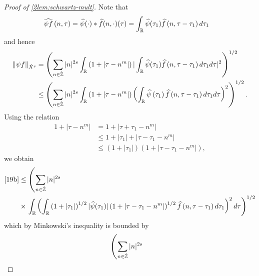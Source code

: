%
%
%
%
%
\begin{proof}[Proof of \cref{2lem:schwartz-mult}]
Note that
%
%
\begin{equation*}
	\begin{split}
		\widehat{\psi f}\left( n, \tau \right)
		& = \widehat{\psi}(\cdot) * \widehat{f}(n,
		\cdot)(\tau)
		= \int_{\mathbb{R}} \widehat{\psi}(\tau_1) \widehat{f} \left( n, \tau - \tau_1 \right) 
		d\tau_1
	\end{split}
\end{equation*}
%
%
and hence
%
%
\begin{equation}
	\label{19b}
	\begin{split}
		\|\psi f\|_{\dot{X}^s} 
		& = \left( \sum_{n \in \dot{\mathbb{Z}}} |n|^{2s} \int_{\mathbb{R}} \left( 1 + | \tau -
		n^{m} | \right) | \int_{\mathbb{R}} \widehat{\psi}(\tau_1) \widehat{f}\left( n, \tau -
		\tau_1
		\right)  d \tau_1 d \tau |^2 \right)^{1/2}
		\\
		& \le \left( \sum_{n \in \dot{\mathbb{Z}}} |n|^{2s} \int_{\mathbb{R}} \left( 1 + | \tau -
		n^{m }
		|
		\right) \left( \int_{\mathbb{R}} \widehat{\psi}\left( \tau_1 \right) \widehat{f}\left( n,
		\tau - \tau_1
		\right)  d \tau_1 d \tau \right)^2 \right)^{1/2}.
	\end{split}
\end{equation}
%
%
Using the relation
%
%
\begin{equation*}
	\begin{split}
		1 + | \tau - n^{m } |
		& = 1 + | \tau + \tau_1 - n^{m} |
		\\
		& \le 1 + | \tau_1 | + | \tau - \tau_1 - n^{m} |
		\\
		& \le \left( 1 + | \tau_1 | \right)\left( 1 + | \tau - \tau_1 -
		n^{m} | \right),
	\end{split}
\end{equation*}
%
%
we obtain
%
%
\begin{equation*}
	\begin{split}
		\eqref{19b}
		& \le \left( \sum_{n \in \dot{\mathbb{Z}}} |n|^{2s} \right.
		\\
		& \times \left . \int_{\mathbb{R}} \left(
		\int_{\mathbb{R}} \left( 1 + | \tau_1 | \right)^{1/2} | \widehat{\psi}(\tau_1) |
		\left( 1 + | \tau - \tau_1 - n^{m} | \right)^{1/2} \widehat{f}\left( n, \tau
		- \tau_1
		\right)d \tau_1
		\right)^2 d \tau \right)^{1/2}
	\end{split}
\end{equation*}
%
%
which by Minkowski's inequality is bounded by
%
%
\begin{equation}
	\label{18a}
	\begin{split}
		& \left( \sum_{n \in \zzdot} |n|^{2s}  \right.

\end{split}
\end{equation}
\end{proof}

